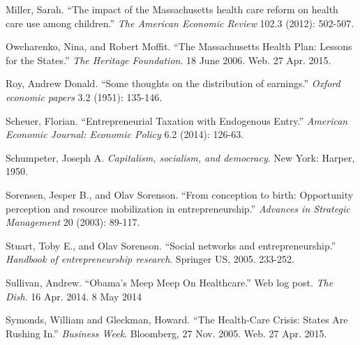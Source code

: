 \documentclass[12pt]{article}
\begin{document}
\begin{thebibliography}{99}
\begin{comment}
\bibitem{himmelstein}
Himmelstein, David U., Deborah Thorne, and Steffie Woolhandler. ``Medical Bankruptcy in Massachusetts: Has Health Reform Made a Difference?'' The American Journal of Medicine 124 (2011): 224-28.

\bibitem{nvca}
National Venture Captial Association. ``Q3 2014 Regional Data: Investments by State'' http://nvca.org/research/venture-investment/

\bibitem{sorensen}
Sorensen, J. B., and M. A. Fassiotto. ``Organizations as Fonts of Entrepreneurship.'' \emph{Organization Science} 22 (2011): 1322-331.



\end{comment}

Miller, Sarah. ``The impact of the Massachusetts health care reform on health care use among children.'' \emph{The American Economic Review} 102.3 (2012): 502-507.

Owcharenko, Nina, and Robert Moffit. ``The Massachusetts Health Plan: Lessons for the States.'' \emph{The Heritage Foundation}. 18 June 2006. Web. 27 Apr. 2015.

Roy, Andrew Donald. ``Some thoughts on the distribution of earnings.'' \emph{Oxford economic papers} 3.2 (1951): 135-146.


Scheuer, Florian. ``Entrepreneurial Taxation with Endogenous Entry.'' \emph{American Economic Journal: Economic Policy} 6.2 (2014): 126-63.

Schumpeter, Joseph A. \emph{Capitalism, socialism, and democracy}. New York: Harper, 1950. 

Sorensen, Jesper B., and Olav Sorenson. ``From conception to birth: Opportunity perception and resource mobilization in entrepreneurship.'' \emph{Advances in Strategic Management} 20 (2003): 89-117.

Stuart, Toby E., and Olav Sorenson. ``Social networks and entrepreneurship.'' \emph{Handbook of entrepreneurship research}. Springer US, 2005. 233-252.

Sullivan, Andrew. ``Obama's Meep Meep On Healthcare.'' Web log post. \emph{The Dish}. 16 Apr. 2014. 8 May 2014 

Symonds, William and Gleckman, Howard.  ``The Health-Care Crisis: States Are Rushing In.'' \emph{Business Week}. Bloomberg, 27 Nov. 2005. Web. 27 Apr. 2015.




\end{thebibliography}
\end{document}
